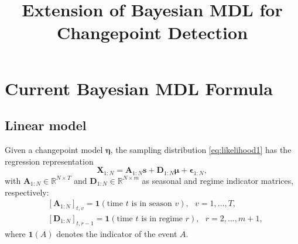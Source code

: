 \documentclass[12pt]{article}
\title{Extension of Bayesian MDL for Changepoint Detection} \date{}
\author{\blind{}{Yingbo Li\footnote{ e-mail: {\tt carolli13@gmail.com}.}}
       }
\begin{document}
\maketitle




%
%
%
%




\section{Current Bayesian MDL Formula}

\subsection{Linear model}

Given a changepoint model $\boldsymbol{\eta}$, the sampling distribution 
\eqref{eq:likelihood1} has the regression representation
\begin{equation}
\label{eq:likelihood3}
\mathbf{X}_{1:N} = \mathbf{A}_{1:N} \mathbf{s} + 
\mathbf{D}_{1:N}\boldsymbol\mu + \boldsymbol\epsilon_{1:N},
\end{equation}
with $\mathbf{A}_{1:N}\in \mathbb{R}^{N \times T}$ and 
$\mathbf{D}_{1:N} \in \mathbb{R}^{N \times m}$ as seasonal and regime 
indicator matrices, respectively:
\begin{align*}
&\left[ \mathbf{A}_{1:N} \right]_{t,v} = 
	\mathbf{1}( \text{time } t \text{ is in season } v ), ~~~ v = 1,  \ldots, T,\\
&\left[ \mathbf{D}_{1:N} \right]_{t,r-1} = 
	\mathbf{1}( \text{time } t \text{ is in regime } r ), ~~~ r = 2, \ldots, m + 1,
\end{align*}
where $\mathbf{1}(A)$ denotes the indicator of the event $A$. 



%
\end{document}
